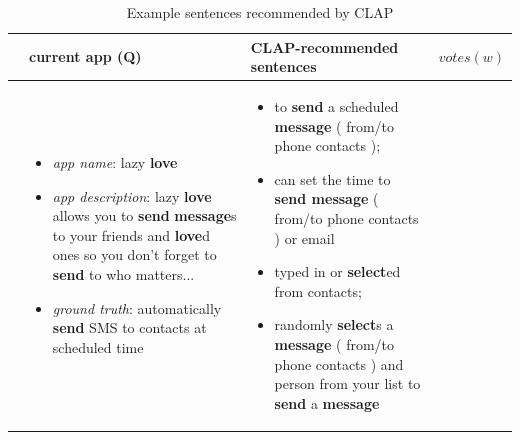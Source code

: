 \begin{table}[t]
\vspace{-0.2in}
\caption{Example sentences recommended by CLAP\label{tab:casestudy}}
\centering
\setlength{\tabcolsep}{1.5em}
{\normalsize
\begin{tabular}{p{1.4cm}||p{6cm}||p{6.5cm}|| p{0.7cm}}
\hline
  & current app (Q) & CLAP-recommended sentences& $votes(w)$\\ \hline 
 \begin{minipage}{0.1\textwidth}
  \hspace{-0.2in}\multirow{1}{*}{\textsf{CONTACT}$_{dev}$}
  \end{minipage}
    & \begin{minipage}{0.34\textwidth}
    \vspace{0.1in}
    \begin{itemize}[leftmargin=*]
    \setlength\itemsep{.5em}
    \item \textit{app name}: lazy \textbf{love}
    \item \textit{app description}: lazy \textbf{love} allows you to \textbf{send} \textbf{message}s to your friends and \textbf{love}d ones so you don't forget to \textbf{send} to who matters...
    \item \emph{ground truth}: automatically \textbf{send} SMS to contacts at scheduled time
\end{itemize}
\vspace{0.1in}
\end{minipage}
     &\begin{minipage}{0.36\textwidth}
     \vspace{0.1in}
     \begin{itemize}[leftmargin=*]
    \setlength\itemsep{.1em}
    \item to \textbf{send} a scheduled \textbf{message} ( from/to phone contacts ); 
    \item can set the time to \textbf{send message} ( from/to phone contacts ) or email
    \item typed in or \textbf{select}ed from contacts;
    \item randomly \textbf{select}s a \textbf{message} ( from/to phone contacts ) and person from your list to \textbf{send} a \textbf{message}
    \end{itemize} 
    \vspace{0.1in}
    \end{minipage} & 
\begin{minipage}{0.1\textwidth}

\end{minipage}
\end{tabular}}
\end{table}
